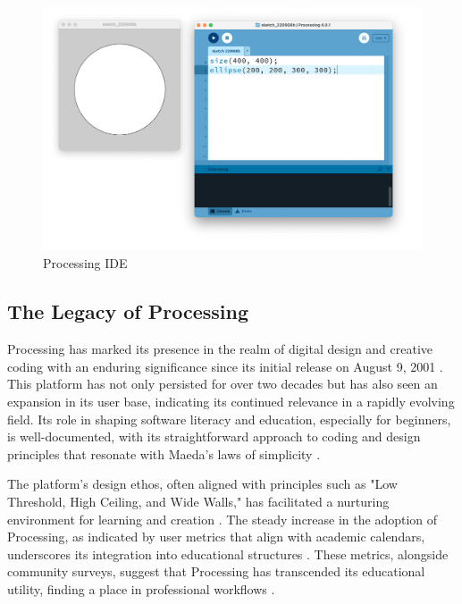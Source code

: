
\begin{figure}
    \includegraphics[width=1\textwidth]{images/processing_ide.png} 
    \caption{Processing IDE \parencite{reasProcessingIDE2015}}
    \label{fig:processing_ide_screenshot}
  \end{figure}
  

\subsection{The Legacy of Processing} %

Processing has marked its presence in the realm of digital design and creative coding with an enduring significance since its initial release on August 9, 2001 \parencite{processingfoundation20thAnniversaryProcessing2022}. This platform has not only persisted for over two decades but has also seen an expansion in its user base, indicating its continued relevance in a rapidly evolving field. Its role in shaping software literacy and education, especially for beginners, is well-documented, with its straightforward approach to coding and design principles that resonate with Maeda’s laws of simplicity \parencite{JohnMaedaLaws2020}.

The platform's design ethos, often aligned with principles such as "Low Threshold, High Ceiling, and Wide Walls," has facilitated a nurturing environment for learning and creation \parencite{resnickDesignPrinciplesTools}. The steady increase in the adoption of Processing, as indicated by user metrics that align with academic calendars, underscores its integration into educational structures \parencite{fryModernPrometheusHistory2018}. These metrics, alongside community surveys, suggest that Processing has transcended its educational utility, finding a place in professional workflows \parencite{2016CommunitySurvey}.

